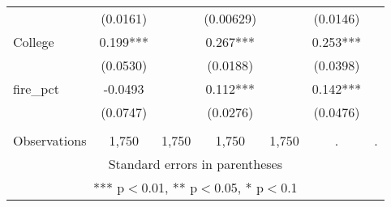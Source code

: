 \begin{tabular}{lcccccc}
 & (0.0161) &  & (0.00629) &  & (0.0146) &  \\
College & 0.199*** &  & 0.267*** &  & 0.253*** &  \\
 & (0.0530) &  & (0.0188) &  & (0.0398) &  \\
fire\_pct & -0.0493 &  & 0.112*** &  & 0.142*** &  \\
 & (0.0747) &  & (0.0276) &  & (0.0476) &  \\
 &  &  &  &  &  &  \\
 Observations & 1,750 & 1,750 & 1,750 & 1,750 & . & . \\ \hline
\multicolumn{7}{c}{ Standard errors in parentheses} \\
\multicolumn{7}{c}{ *** p$<$0.01, ** p$<$0.05, * p$<$0.1} \\
\end{tabular}
